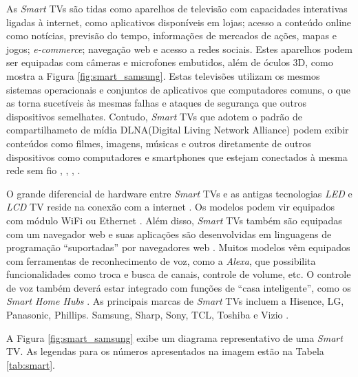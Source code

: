 
As \emph{Smart} TVs são tidas como aparelhos de televisão com capacidades interativas ligadas à internet, como aplicativos disponíveis em lojas; acesso a conteúdo online como notícias, previsão do tempo, informações de mercados de ações, mapas e jogos; \emph{e-commerce}; navegação web e acesso a redes sociais. Estes aparelhos podem ser equipadas com câmeras e microfones embutidos, além de óculos 3D, como mostra a Figura \ref{fig:smart_samsung}. Estas televisões utilizam os mesmos sistemas operacionais e conjuntos de aplicativos que computadores comuns, o que as torna sucetíveis às mesmas falhas e ataques de segurança que outros dispositivos semelhates. Contudo, \emph{Smart} TVs que adotem o padrão de compartilhameto de mídia DLNA(Digital Living Network Alliance) podem exibir conteúdos como filmes, imagens, músicas e outros diretamente de outros dispositivos como computadores e smartphones que estejam conectados à mesma rede sem fio \cite{michele2014watch}, \cite{shin2013smart}, \cite{perakakis2015proposed}, \cite{whatisasmarttv}.

O grande diferencial de hardware entre \emph{Smart} TVs e as antigas tecnologias \emph{LED} e \emph{LCD} TV reside na conexão com a internet \cite{differencebetween}. Os modelos podem vir equipados com módulo WiFi ou Ethernet \cite{tomsguid:everythingsmart}. Além disso, \emph{Smart} TVs também são equipadas com um navegador web e suas aplicações são desenvolvidas em linguagens de programação ``suportadas'' por navegadores web \cite{mautilus:specificationsforsmart}. Muitos modelos vêm equipados com ferramentas de reconhecimento de voz, como a \emph{Alexa}, que possibilita funcionalidades como troca e busca de canais, controle de volume, etc. O controle de voz também deverá estar integrado com funções de ``casa inteligente'', como os \emph{Smart Home Hubs} \cite{tomsguid:everythingsmart}. As principais marcas de \emph{Smart} TVs incluem a Hisence, LG, Panasonic, Phillips. Samsung, Sharp, Sony, TCL, Toshiba e Vizio \cite{tomsguid:everythingsmart}.

A Figura \ref{fig:smart_samsung} exibe um diagrama representativo de uma \emph{Smart} TV. As legendas para os números apresentados na imagem estão na Tabela \ref{tab:smart}.

